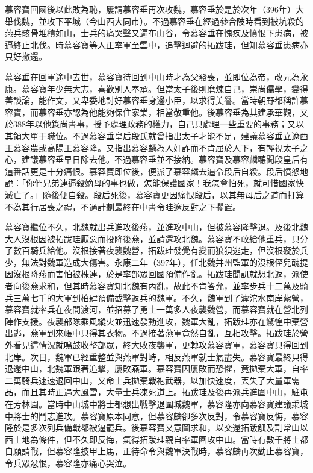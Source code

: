 慕容寶回國後以此敗為恥，屢請慕容垂再次攻魏，慕容垂於是於次年（396年）大舉伐魏，並攻下平城（今山西大同市）。不過慕容垂在經過參合陂時看到被坑殺的燕兵骸骨堆積如山，士兵的痛哭聲又遍布山谷，令慕容垂在愧疚及憤恨下患病，被逼終止北伐。時慕容寶等人正率軍至雲中，追擊迴避的拓跋珪，但知慕容垂患病亦只好撤還。

慕容垂在回軍途中去世，慕容寶待回到中山時才為父發喪，並即位為帝，改元為永康。慕容寶年少無大志，喜歡別人奉承。但當太子後則磨煉自己，崇尚儒學，變得善談論，能作文，又卑委地討好慕容垂身邊小臣，以求得美譽。當時朝野都稱許慕容寶，而慕容垂亦認為他能夠保住家業，相當敬重他。後慕容垂為其建承華觀，又於388年以他錄尚書事，授予處理政務的權力，自己只處理一些重要的事務；又以其領大單于職位。不過慕容垂皇后段氏就曾指出太子才能不足，建議慕容垂立遼西王慕容農或高陽王慕容隆。又指出慕容麟為人奸詐而不肯屈於人下，有輕視太子之心，建議慕容垂早日除去他。不過慕容垂並不接納。慕容寶及慕容麟聽聞段皇后有這番話更是十分痛恨。慕容寶即位後，便派了慕容麟去逼令段后自殺。段后憤怒地說：「你們兄弟連逼殺嫡母的事也做，怎能保護國家！我怎會怕死，就可惜國家快滅亡了。」隨後便自殺。段后死後，慕容寶更因痛恨段后，以其無母后之道而打算不為其行居喪之禮，不過計劃最終在中書令眭邃反對之下擱置。

慕容寶繼位不久，北魏就出兵進攻後燕，並進攻中山，但被慕容隆擊退。及後北魏大人沒根因被拓跋珪厭惡而投降後燕，並請還攻北魏。慕容寶不敢給他重兵，只分了數百騎兵給他。沒根接著夜襲魏營，拓跋珪發覺有變而狼狽逃走，但沒根礙於兵少，無法對魏軍造成大傷害。永康二年（397年），任北魏并州監軍的沒根侄兒醜提因沒根降燕而害怕被株連，於是率部眾回國預備作亂。拓跋珪聞訊就想北返，派使者向後燕求和，但其時慕容寶知北魏有內亂，故此不肯答允，並率步兵十二萬及騎兵三萬七千的大軍到柏肆預備截擊返兵的魏軍。不久，魏軍到了滹沱水南岸紥營，慕容寶就率兵在夜間渡河，並招募了勇士一萬多人夜襲魏營，而慕容寶就在營北列陣作支援。夜襲部隊乘風縱火並迅速發動進攻，魏軍大亂，拓跋珪亦在驚惶中棄營出逃，燕軍到來帳中只得其衣物。不過接著燕軍竟然自亂，互相攻擊。拓跋珪於營外看見這情況就鳴鼓收整部眾，終大敗夜襲軍，更轉攻慕容寶軍，慕容寶只得回到北岸。次日，魏軍已經重整並與燕軍對峙，相反燕軍就士氣盡失。慕容寶最終只得退還中山，北魏軍跟著追擊，屢敗燕軍。慕容寶因屢敗而恐懼，竟拋棄大軍，自率二萬騎兵速速退回中山，又命士兵拋棄戰袍武器，以加快速度，丟失了大量軍需品，而且其時正遇大風雪，大量士兵凍死道上。拓跋珪及後再派兵進圍中山，駐屯在芳林園。當時中山城中將士都想出戰擊退圍城魏軍，慕容隆亦向慕容寶建議乘城中將士的鬥志進攻。慕容寶原本同意，但慕容麟卻多次反對，令慕容寶反悔，慕容隆於是多次列兵備戰都被逼罷兵。後慕容寶又意圖求和，以交還拓跋觚及割常山以西土地為條件，但不久即反悔，氣得拓跋珪親自率軍圍攻中山。當時有數千將士都自願請戰，但慕容隆披甲上馬，正待命令與魏軍決戰時，慕容麟再次勸止慕容寶，令兵眾忿恨，慕容隆亦痛心哭泣。


